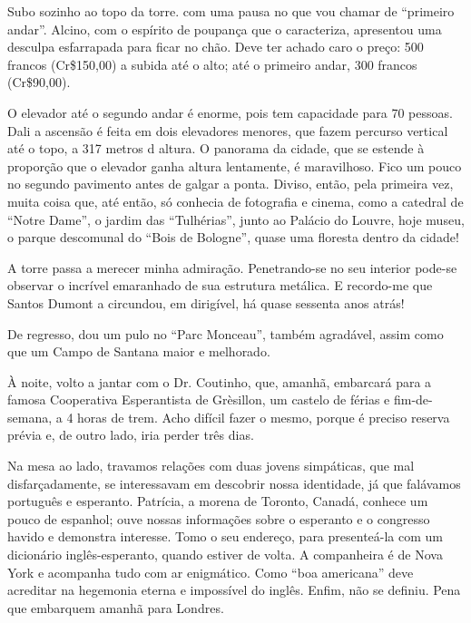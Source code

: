 Subo sozinho ao topo da torre. com uma pausa no que vou chamar de “primeiro andar”. Alcino, com o espírito de poupança que o caracteriza, apresentou uma desculpa esfarrapada para ficar no chão. Deve ter achado caro o preço: 500 francos (Cr\$150,00) a subida até o alto; até o primeiro andar, 300 francos (Cr\$90,00).

O elevador até o segundo andar é enorme, pois tem capacidade para 70 pessoas. Dali a ascensão é feita em dois elevadores menores, que fazem percurso vertical até o topo, a 317 metros d altura. O panorama da cidade, que se estende à proporção que o elevador ganha altura lentamente, é maravilhoso. Fico um pouco no segundo pavimento antes de galgar a ponta. Diviso, então, pela primeira vez, muita coisa que, até então, só conhecia de fotografia e cinema, como a catedral de “Notre Dame”, o jardim das “Tulhérias”, junto ao Palácio do Louvre, hoje museu, o parque descomunal do “Bois de Bologne”, quase uma floresta dentro da cidade!

A torre passa a merecer minha admiração. Penetrando-se no seu interior pode-se observar o incrível emaranhado de sua estrutura metálica. E recordo-me que Santos Dumont a circundou, em dirigível, há quase sessenta anos atrás!

De regresso, dou um pulo no “Parc Monceau”, também agradável, assim como que um Campo de Santana maior e melhorado.

À noite, volto a jantar com o Dr. Coutinho, que, amanhã, embarcará para a famosa Cooperativa Esperantista de Grèsillon, um castelo de férias e fim-de-semana, a 4 horas de trem. Acho difícil fazer o mesmo, porque é preciso reserva prévia e, de outro lado, iria perder três dias.

Na mesa ao lado, travamos relações com duas jovens simpáticas, que mal disfarçadamente, se interessavam em descobrir nossa identidade, já que falávamos português e esperanto. Patrícia, a morena de Toronto, Canadá, conhece um pouco de espanhol; ouve nossas informações sobre o esperanto e o congresso havido e demonstra interesse. Tomo o seu endereço, para presenteá-la com um dicionário inglês-esperanto, quando estiver de volta. A companheira é de Nova York e acompanha tudo com ar enigmático. Como “boa americana” deve acreditar na hegemonia eterna e impossível do inglês. Enfim, não se definiu. Pena que embarquem amanhã para Londres.

